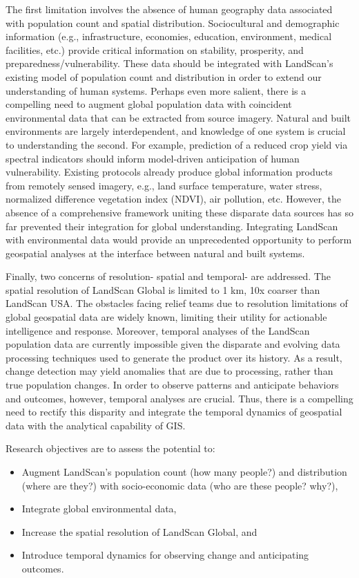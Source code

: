 \documentclass[11pt,letterpaper,sans]{moderncv}
\begin{document}
The first limitation involves the absence of human geography data associated with population count and spatial distribution. Sociocultural and demographic information (e.g., infrastructure, economies, education, environment, medical facilities, etc.) provide critical information on stability, prosperity, and preparedness/vulnerability. These data should be integrated with LandScan's existing model of population count and distribution in order to extend our understanding of human systems. 
Perhaps even more salient, there is a compelling need to augment global population data with coincident environmental data that can be extracted from source imagery.  Natural and built environments are largely interdependent, and knowledge of one system is crucial to understanding the second. For example, prediction of a reduced crop yield via spectral indicators should inform model-driven anticipation of human vulnerability. Existing protocols already produce global information products from remotely sensed imagery, e.g., land surface temperature, water stress, normalized difference vegetation index (NDVI), air pollution, etc. However, the absence of a comprehensive framework uniting these disparate data sources has so far prevented their integration for global understanding. Integrating LandScan with environmental data would provide an unprecedented opportunity to perform geospatial analyses at the interface between natural and built systems.
\newline 

Finally, two concerns of resolution- spatial and temporal- are addressed. The spatial resolution of LandScan Global is limited to 1 km, 10x coarser than LandScan USA. The obstacles facing relief teams due to resolution limitations of global geospatial data are widely known, limiting their utility for actionable intelligence and response.  Moreover, temporal analyses of the LandScan population data are currently impossible given the disparate and evolving data processing techniques used to generate the product over its history. As a result, change detection may yield anomalies that are due to processing, rather than true population changes. In order to observe patterns and anticipate behaviors and outcomes, however, temporal analyses are crucial. Thus, there is a compelling need to rectify this disparity and integrate the temporal dynamics of geospatial data with the analytical capability of GIS. 
\newline 

Research objectives are to assess the potential to: 
\begin{itemize}
\item Augment LandScan's population count (how many people?) and distribution (where are they?) with socio-economic data (who are these people? why?), 
\item Integrate global environmental data, 
\item Increase the spatial resolution of LandScan Global, and 
\item Introduce temporal dynamics for observing change and anticipating outcomes.
\end{itemize}
\
\end{document}
